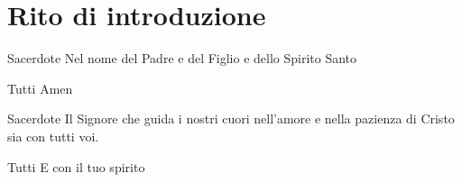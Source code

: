 
\section*{Rito di introduzione}

\begin{dialoghi}
	\item[Sacerdote] Nel nome del Padre e del Figlio e dello Spirito Santo
	\item[Tutti] Amen
	\item[Sacerdote] Il Signore che guida i nostri cuori nell'amore e nella pazienza di Cristo sia con tutti voi.
	\item[Tutti] E con il tuo spirito
\end{dialoghi}

